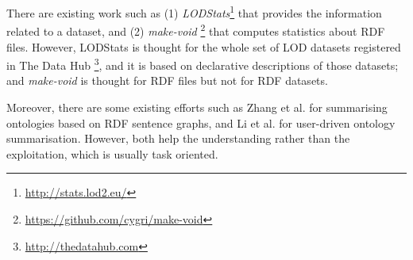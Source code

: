 There are existing work such as (1) \emph{LODStats}\footnote{\footnotesize \url{http://stats.lod2.eu/}} that provides the information related to a dataset, and (2) \emph{make-void} \footnote{\footnotesize \url{https://github.com/cygri/make-void}} that computes statistics about RDF files. However, LODStats is thought for the whole set of LOD datasets registered in The Data Hub \footnote{\footnotesize \url{http://thedatahub.com}}, and it is based on declarative descriptions of those datasets; and \emph{make-void} is thought for RDF files but not for RDF datasets.

Moreover, there are some existing efforts such as Zhang et al.\cite{ZhangCQ07} for summarising ontologies based on RDF sentence graphs, and Li et al. \cite{LiM10} for user-driven ontology summarisation. However, both help the understanding rather than the exploitation, which is usually task oriented.

